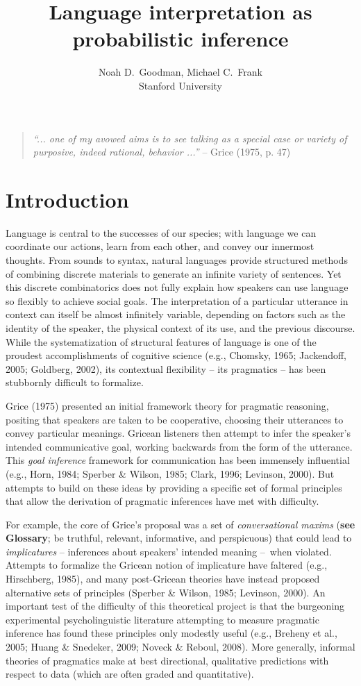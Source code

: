 \documentclass[]{elsarticle}
\title{Language interpretation as probabilistic inference}
\author{Noah D.~Goodman, Michael C.~Frank\\
Stanford University}
\date{}
\begin{document}
\maketitle

\begin{quote}
\emph{``... one of my avowed aims is to see talking as a special case or
variety of purposive, indeed rational, behavior ...''} -- Grice (1975,
p. 47)
\end{quote}

\section{Introduction}\label{introduction}

Language is central to the successes of our species; with language we
can coordinate our actions, learn from each other, and convey our
innermost thoughts. From sounds to syntax, natural languages provide
structured methods of combining discrete materials to generate an
infinite variety of sentences. Yet this discrete combinatorics does not
fully explain how speakers can use language so flexibly to achieve
social goals. The interpretation of a particular utterance in context
can itself be almost infinitely variable, depending on factors such as
the identity of the speaker, the physical context of its use, and the
previous discourse. While the systematization of structural features of
language is one of the proudest accomplishments of cognitive science
(e.g., Chomsky, 1965; Jackendoff, 2005; Goldberg, 2002), its contextual
flexibility -- its pragmatics -- has been stubbornly difficult to
formalize.

Grice (1975) presented an initial framework theory for pragmatic
reasoning, positing that speakers are taken to be cooperative, choosing
their utterances to convey particular meanings. Gricean listeners then
attempt to infer the speaker's intended communicative goal, working
backwards from the form of the utterance. This \emph{goal inference}
framework for communication has been immensely influential (e.g., Horn,
1984; Sperber \& Wilson, 1985; Clark, 1996; Levinson, 2000). But
attempts to build on these ideas by providing a specific set of formal
principles that allow the derivation of pragmatic inferences have met
with difficulty.

For example, the core of Grice's proposal was a set of
\emph{conversational maxims} (\textbf{see Glossary}; be truthful,
relevant, informative, and perspicuous) that could lead to
\emph{implicatures} -- inferences about speakers' intended meaning
--~when violated. Attempts to formalize the Gricean notion of
implicature have faltered (e.g., Hirschberg, 1985), and many
post-Gricean theories have instead proposed alternative sets of
principles (Sperber \& Wilson, 1985; Levinson, 2000). An important test
of the difficulty of this theoretical project is that the burgeoning
experimental psycholinguistic literature attempting to measure pragmatic
inference has found these principles only modestly useful (e.g., Breheny
et al., 2005; Huang \& Snedeker, 2009; Noveck \& Reboul, 2008). More
generally, informal theories of pragmatics make at best directional,
qualitative predictions with respect to data (which are often graded and
quantitative).
\end{document}
